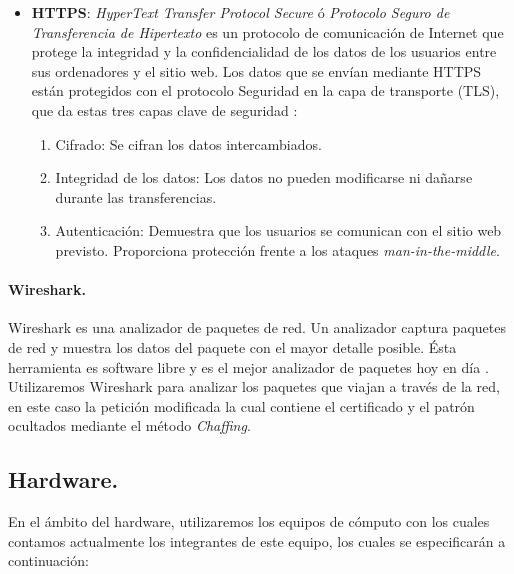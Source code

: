 \documentclass[12pt, a4paper, titlepage]{report}
\begin{document}
\begin{itemize}
                \item \textbf{HTTPS}: \textit{HyperText Transfer Protocol Secure} ó \textit{Protocolo Seguro de Transferencia de Hipertexto} es un protocolo de comunicación de Internet que protege la integridad y la confidencialidad de los datos de los usuarios entre sus ordenadores y el sitio web. Los datos que se envían mediante HTTPS están protegidos con el protocolo Seguridad en la capa de transporte (TLS), que da estas tres capas clave de seguridad \cite{HTTPSprotocolOSI}: 
                \begin{enumerate}
                    \item Cifrado: Se cifran los datos intercambiados.
                    \item Integridad de los datos: Los datos no pueden modificarse ni dañarse durante las transferencias.
                    \item Autenticación: Demuestra que los usuarios se comunican con el sitio web previsto. Proporciona protección frente a los ataques \textit{man-in-the-middle}.
                \end{enumerate}
                
            \end{itemize}
            
			\paragraph{Wireshark. \\}
			Wireshark es una analizador de paquetes de red. Un analizador captura paquetes de red y muestra los datos del paquete con el mayor detalle posible. Ésta herramienta es software libre y es el mejor analizador de paquetes hoy en día \cite{refWireshark}. Utilizaremos Wireshark para analizar los paquetes que viajan a través de la red, en este caso la petición modificada la cual contiene el certificado y el patrón ocultados mediante el método \textit{Chaffing}.
			\label{WiresharkDefinition}
			
			\paragraph{}
			
			
			
		\subsection{Hardware.}
			En el ámbito del hardware, utilizaremos los equipos de cómputo con los cuales contamos actualmente los integrantes de este equipo, los cuales se especificarán a continuación: 
			
\end{document}
